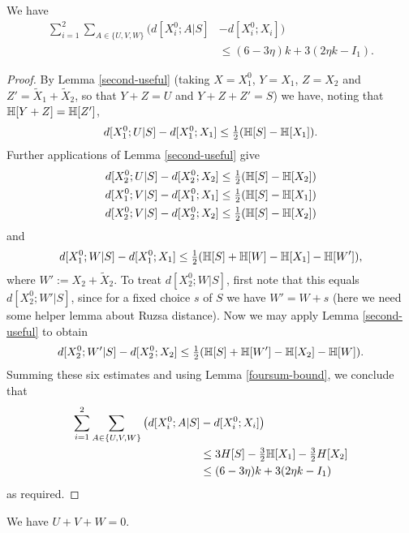 \begin{lemma}\label{total-dist}\leanok
   We have
\begin{align*}
  \sum_{i=1}^2 \sum_{A\in\{U,V,W\}} \big(d[X^0_i;A|S] & - d[X^0_i;X_i]\big) \\
    &\leq (6 - 3\eta) k + 3(2 \eta k - I_1).
\end{align*}
\end{lemma}

\begin{proof}
  By Lemma \ref{second-useful} (taking $X = X_1^0$, $Y = X_1$, $Z = X_2$ and $Z' = \tilde X_1 + \tilde X_2$, so that $Y + Z = U$ and $Y + Z + Z' = S$) we have, noting that $\mathbb{H}[Y+Z] = \mathbb{H}[Z']$,
  \[
    d[X^0_1;U|S] - d[X^0_1;X_1] \leq \tfrac{1}{2} (\mathbb{H}[S] -  \mathbb{H}[X_1]).
  \]
  Further applications of Lemma \ref{second-useful} give
  \begin{align*}
  d[X^0_2;U|S] - d[X^0_2; X_2] &\leq \tfrac{1}{2} (\mathbb{H}[S] -  \mathbb{H}[X_2]) \\
  d[X^0_1;V|S] - d[X^0_1;X_1] &\leq \tfrac{1}{2} (\mathbb{H}[S] -  \mathbb{H}[X_1])\\
  d[X^0_2;V|S] - d[X^0_2;X_2] &\leq \tfrac{1}{2} (\mathbb{H}[S] -  \mathbb{H}[X_2])
  \end{align*}
  and
  \[ d[X^0_1;W|S] - d[X^0_1;X_1] \leq \tfrac{1}{2} (\mathbb{H}[S] + \mathbb{H}[W] - \mathbb{H}[X_1] - \mathbb{H}[W']),\] where $W' := X_2 + \tilde X_2$.
  To treat $d[X^0_2;W|S]$, first note that this equals $d[X^0_2;W'|S]$, since for a fixed choice $s$ of $S$ we have $W' = W + s$ (here we need some helper lemma about Ruzsa distance). Now we may apply Lemma \ref{second-useful} to obtain
  \[ d[X^0_2;W'|S] - d[X^0_2;X_2] \leq \tfrac{1}{2} (\mathbb{H}[S] + \mathbb{H}[W'] - \mathbb{H}[X_2] - \mathbb{H}[W]).\]
  Summing these six estimates and using Lemma \ref{foursum-bound}, we conclude that
  \begin{align*}
    \sum_{i=1}^2 \sum_{A\in\{U,V,W\}} \big(d[X^0_i;A|S] & - d[X^0_i;X_i]\big) \\
      &\leq 3H[S] - \tfrac{3}{2} \mathbb{H}[X_1] - \tfrac{3}{2}H[X_2]\\
      &\leq (6 - 3\eta) k + 3(2 \eta k - I_1)
  \end{align*}
  as required.
\end{proof}

\begin{lemma}\label{key-ident}
\leanok
We have $U+V+W=0$.
\end{lemma}

